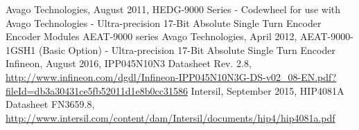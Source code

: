 \begin{thebibliography}{21} %
	Avago Technologies, August 2011, HEDG-9000 Series - Codewheel for use with Avago Technologies - Ultra-precision 17-Bit Absolute Single Turn Encoder
Encoder Modules AEAT-9000 series
	Avago Technologies, April 2012, AEAT-9000-1GSH1 (Basic Option) - Ultra-precision 17-Bit Absolute Single Turn Encoder
	Infineon, August 2016, IPP045N10N3 Datasheet Rev. 2.8, \url{http://www.infineon.com/dgdl/Infineon-IPP045N10N3G-DS-v02_08-EN.pdf?fileId=db3a30431ce5fb52011d1e8b0cc31586}
	Intersil, September 2015, HIP4081A Datasheet FN3659.8, \url{http://www.intersil.com/content/dam/Intersil/documents/hip4/hip4081a.pdf}
\end{thebibliography}